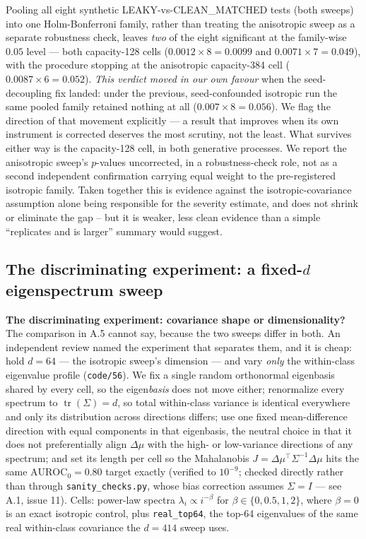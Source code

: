 \documentclass[10pt]{article} %
\begin{document}
Pooling all eight synthetic LEAKY-vs-CLEAN\_MATCHED tests (both sweeps) into
one Holm-Bonferroni family, rather than treating the anisotropic sweep as a
separate robustness check, leaves \emph{two} of the eight significant at the
family-wise $0.05$ level --- both capacity-128 cells ($0.0012\times8=0.0099$
and $0.0071\times7=0.049$), with the procedure stopping at the anisotropic
capacity-384 cell ($0.0087\times6=0.052$). \emph{This verdict moved in our own
favour} when the seed-decoupling fix landed: under the previous,
seed-confounded isotropic run the same pooled family retained nothing at all
($0.007\times8=0.056$). We flag the direction of that movement explicitly ---
a result that improves when its own instrument is corrected deserves the most
scrutiny, not the least. What survives either way is the capacity-128 cell, in
both generative processes. We report the anisotropic sweep's $p$-values
uncorrected, in a robustness-check role, not as a second independent
confirmation carrying equal weight to the pre-registered isotropic family.
Taken together this is evidence against the isotropic-covariance assumption
alone being responsible for the severity estimate, and does not shrink or
eliminate the gap -- but it is weaker, less clean evidence than a simple
``replicates and is larger'' summary would suggest.

\subsection{The discriminating experiment: a fixed-$d$ eigenspectrum sweep}

\textbf{The discriminating experiment: covariance shape or dimensionality?}
The comparison in A.5 cannot say, because the two sweeps differ in both. An
independent review named the experiment that separates them, and it is cheap:
hold $d=64$ --- the isotropic sweep's dimension --- and vary \emph{only} the
within-class eigenvalue profile (\texttt{code/56}). We fix a single random
orthonormal eigenbasis shared by every cell, so the eigen\emph{basis} does not
move either; renormalize every spectrum to $\operatorname{tr}(\Sigma)=d$, so
total within-class variance is identical everywhere and only its distribution
across directions differs; use one fixed mean-difference direction with equal
components in that eigenbasis, the neutral choice in that it does not
preferentially align $\Delta\mu$ with the high- or low-variance directions of
any spectrum; and set its length per cell so the Mahalanobis
$J=\Delta\mu^\top\Sigma^{-1}\Delta\mu$ hits the same $\text{AUROC}_0=0.80$
target exactly (verified to $10^{-9}$; checked directly rather than through
\texttt{sanity\_checks.py}, whose bias correction assumes $\Sigma=I$ --- see A.1, issue 11). Cells: power-law spectra $\lambda_i\propto i^{-\beta}$
for $\beta\in\{0,0.5,1,2\}$, where $\beta=0$ is an exact isotropic control,
plus \texttt{real\_top64}, the top-64 eigenvalues of the same real within-class
covariance the $d=414$ sweep uses.
\end{document}
